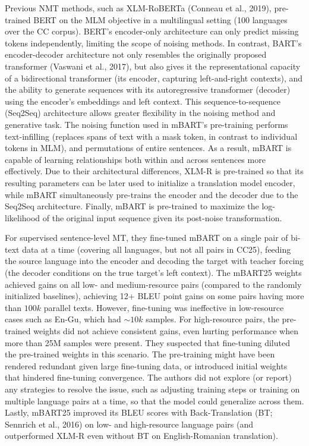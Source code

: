 \documentclass[11pt]{article}
\begin{document}
Previous NMT methods, such as XLM-RoBERTa (Conneau et al., 2019), pre-trained BERT on 
the MLM objective in a multilingual setting (100 languages over the CC corpus). BERT's encoder-only architecture can only predict missing tokens independently, 
limiting the scope of noising methods.
In contrast, BART's encoder-decoder architecture not only resembles the originally proposed transformer (Vaswani et al., 2017), 
but also gives it the representational capacity of a bidirectional transformer (its encoder, capturing left-and-right contexts),
and the ability to generate sequences with its autoregressive transformer (decoder) using the encoder's embeddings and left context. 
This sequence-to-sequence (Seq2Seq) architecture allows greater flexibility in the noising method and generative task. 
The noising function used in mBART's pre-training performs text-infilling (replaces spans of text with a mask token, in contrast to individual tokens in MLM), 
and permutations of entire sentences. As a result, mBART is capable of learning relationships both within and across sentences more effectively. 
Due to their architectural differences, XLM-R is pre-trained
so that its resulting parameters can be later used to initialize a translation model encoder, while
mBART simultaneously pre-trains the encoder and the decoder due to the Seq2Seq architecture. 
Finally, mBART is pre-trained to maximize the log-likelihood 
of the original input sequence given its post-noise transformation.

For supervised sentence-level MT, 
they fine-tuned mBART on a single pair of bi-text data at a time (covering all languages, but not all pairs in CC25), feeding the
source language into the encoder and decoding the target with teacher forcing (the decoder conditions on the true target's left context).
The mBART25 weights achieved gains on all low- and medium-resource pairs (compared to the randomly initialized baselines), 
achieving 12+ BLEU point gains on some pairs 
having more than $100k$ parallel texts. However, fine-tuning was ineffective in low-resource cases such as En-Gu, which had $\sim$$10k$ samples.
For high-resource pairs, the pre-trained weights did not achieve consistent gains, 
even hurting performance when more than 25M samples were present. They
suspected that fine-tuning diluted the pre-trained weights in this scenario. 
The pre-training might have been rendered redundant given large fine-tuning data,
or introduced initial weights that hindered fine-tuning convergence. The authors did not explore (or report)
any strategies to resolve the issue, such as adjusting training steps or 
training on multiple language pairs at a time, so that the model could generalize across them.
Lastly, mBART25 improved its
BLEU scores with Back-Translation (BT;
Sennrich et al., 2016) on low- and high-resource language pairs (and outperformed XLM-R even without BT on English-Romanian translation).
\end{document}

